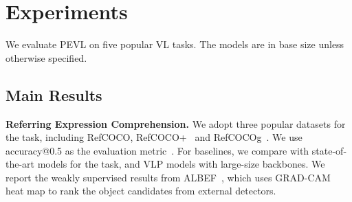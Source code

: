 \documentclass[11pt]{article}
\begin{document}
\section{Experiments}
We evaluate PEVL on five popular VL tasks. The models are in base size unless otherwise specified.


\subsection{Main Results}
\label{sec:main results}

\smallskip
\textbf{Referring Expression Comprehension.}
We adopt three popular datasets for the task, including RefCOCO, RefCOCO+~\cite{yu2016modeling} and RefCOCOg~\cite{mao2016generation}. We use accuracy@0.5 as the evaluation metric~\cite{kamath2021mdetr}. For baselines, we compare with state-of-the-art models for the task, and VLP models with large-size backbones. We report the weakly supervised results from ALBEF~\cite{li2021align}, which uses GRAD-CAM~\cite{selvaraju2017grad} heat map to rank the object candidates from external detectors.


\begin{table}[!t]
    \begin{center}
    \caption{Experimental results of visual relation detection on Visual Genome dataset.}
    \label{table:vrd}
    \end{center}
\vspace{-0.32em}
\end{table}
\end{document}

